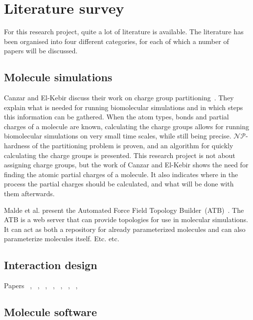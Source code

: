 \chapter{Literature survey}

For this research project, quite a lot of literature is available. The literature has been organised into four different categories, for each of which a number of papers will be discussed.


\section{Molecule simulations}

Canzar and El-Kebir discuss their work on charge group partitioning~\cite{canzar2012charge}. They explain what is needed for running biomolecular simulations and in which steps this information can be gathered. When the atom types, bonds and partial charges of a molecule are known, calculating the charge groups allows for running biomolecular simulations on very small time scales, while still being precise. $\mathcal{NP}$-hardness of the partitioning problem is proven, and an algorithm for quickly calculating the charge groups is presented. This research project is not about assigning charge groups, but the work of Canzar and El-Kebir shows the need for finding the atomic partial charges of a molecule. It also indicates where in the process the partial charges should be calculated, and what will be done with them afterwards.

Malde et al. present the Automated Force Field Topology Builder~(ATB)~\cite{malde2011automated}. The ATB is a web server that can provide topologies for use in molecular simulations. It can act as both a repository for already parameterized molecules and can also parameterize molecules itself. Etc. etc.


\section{Interaction design}

Papers ~\cite{norman2002design}, ~\cite{norman1990interfaces}, ~\cite{norman2002emotion}, ~\cite{norman2005human}, ~\cite{norman2010gestural}, ~\cite{thimbleby2007press}, ~\cite{blair2008user}, ~\cite{badre2002shaping}


\section{Molecule software}

